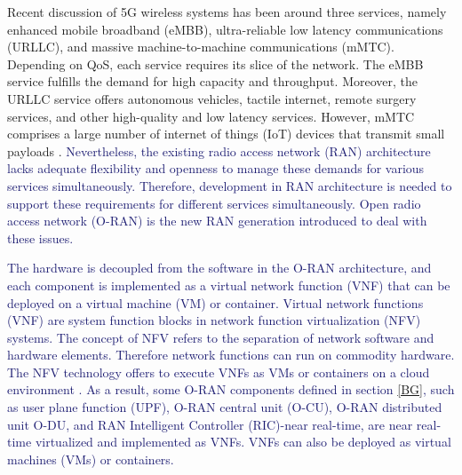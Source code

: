 \documentclass[lettersize,journal]{IEEEtran}
\begin{document}
Recent discussion of 5G wireless systems has been around three services, namely enhanced mobile broadband (eMBB), ultra-reliable low latency communications (URLLC), and massive machine-to-machine communications (mMTC). Depending on QoS, each service requires its slice of the network.
The eMBB service fulfills the demand for high capacity and throughput. Moreover, the URLLC service offers autonomous vehicles, tactile internet, remote surgery services, and other high-quality and low latency services. However, mMTC comprises a large number of internet of things (IoT) devices that transmit small payloads
\cite{shen2020ai,setayesh2020joint,popovski20185g,dogra2020survey,kassab2018coexistence,alsenwi2021intelligent}.
\textcolor{MidnightBlue}{Nevertheless, the existing radio access network (RAN) architecture lacks adequate flexibility and openness to manage these demands for various services simultaneously. Therefore, development in RAN architecture is needed to support these requirements for different services simultaneously. Open radio access network (O-RAN) is the new RAN generation introduced to deal with these issues.}

\textcolor{MidnightBlue}{The hardware is decoupled from the software in the O-RAN architecture, and each component is implemented as a virtual network function (VNF) that can be deployed on a virtual machine (VM) or container. }
\textcolor{MidnightBlue}{Virtual network functions (VNF) are system function blocks in network function virtualization (NFV) systems. The concept of NFV refers to the separation of network software and hardware elements. Therefore network functions can run on commodity hardware. The NFV technology offers to execute VNFs as VMs or containers on a cloud environment \cite{mijumbi2015network, luo2020online}.}
\textcolor{MidnightBlue}{As a result, some O-RAN components defined in section \ref{BG}, such as user plane function (UPF), O-RAN central unit (O-CU), O-RAN distributed unit O-DU, and RAN Intelligent Controller (RIC)-near real-time, are near real-time virtualized and implemented as VNFs. VNFs can also be deployed as virtual machines (VMs) or containers.}
\end{document}
